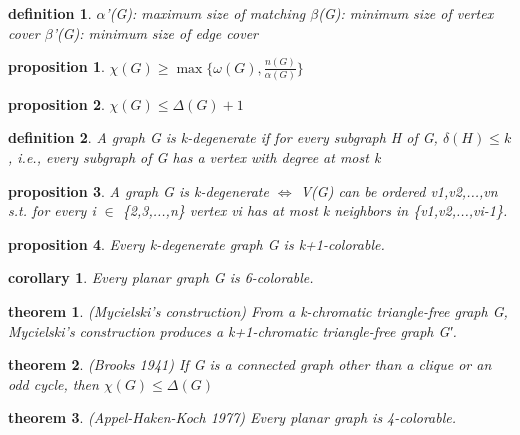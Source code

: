 \documentclass[twocolumn]{article}
\newtheorem{theorem}{theorem}[section]  %
\newtheorem{definition}{definition}
\newtheorem{proposition}{proposition}
\newtheorem{corollary}{corollary}
\begin{document}
\begin{CJK*}{UTF8}{bkai}
\begin{definition}
 $\alpha$'(G): maximum size of matching
 $\beta$(G): minimum size of vertex cover
 $\beta$'(G): minimum size of edge cover
    \end{definition}

    \begin{proposition}
        $\chi(G) \geq \max \{ \omega(G) , \frac{n(G)}{\alpha(G)} \}$
    \end{proposition}

    \begin{proposition}
        $\chi(G) \leq \Delta(G) + 1$
    \end{proposition}

    \begin{definition}
         A graph G is k-degenerate if for every subgraph H of G, $\delta(H) \leq k$, i.e., every subgraph of G has a vertex with degree at most k
    \end{definition}

    \begin{proposition}
        A graph G is k-degenerate $\iff$ V(G) can be ordered v1,v2,...,vn s.t. for every
 i $\in$ \{2,3,...,n\} vertex vi has at most k neighbors in \{v1,v2,...,vi-1\}.
    \end{proposition}

    \begin{proposition}
         Every k-degenerate graph G is k+1-colorable.
    \end{proposition}

    \begin{corollary}
         Every planar graph G is 6-colorable.
    \end{corollary}

    \begin{theorem}{(Mycielski's construction)}
        From a k-chromatic triangle-free graph G, Mycielski's construction produces a k+1-chromatic triangle-free graph G′.

    \end{theorem}

    \begin{theorem}{(Brooks 1941)}
        If G is a connected graph other than a clique or an odd cycle, then
        $\chi(G) \leq \Delta(G)$

    \end{theorem}

    \begin{theorem}{(Appel-Haken-Koch 1977)}
         Every planar graph is 4-colorable.
    \end{theorem}


\end{CJK*}
\end{document}
